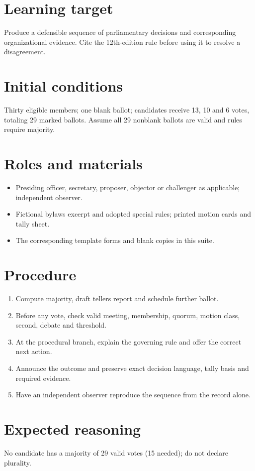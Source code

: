 \documentclass[11pt]{article}
\begin{document}
\SuiteOpen
\section{Learning target}
Produce a defensible sequence of parliamentary decisions and corresponding organizational evidence. Cite the 12th-edition rule before using it to resolve a disagreement.

\section{Initial conditions}
Thirty eligible members; one blank ballot; candidates receive 13, 10 and 6 votes, totaling 29 marked ballots. Assume all 29 nonblank ballots are valid and rules require majority.

\section{Roles and materials}
\begin{itemize}[leftmargin=*,itemsep=4pt]
\item Presiding officer, secretary, proposer, objector or challenger as applicable; independent observer.
\item Fictional bylaws excerpt and adopted special rules; printed motion cards and tally sheet.
\item The corresponding template forms and blank copies in this suite.
\end{itemize}

\section{Procedure}
\begin{enumerate}[leftmargin=*,itemsep=4pt]
\item Compute majority, draft tellers report and schedule further ballot.
\item Before any vote, check valid meeting, membership, quorum, motion class, second, debate and threshold.
\item At the procedural branch, explain the governing rule and offer the correct next action.
\item Announce the outcome and preserve exact decision language, tally basis and required evidence.
\item Have an independent observer reproduce the sequence from the record alone.
\end{enumerate}

\section{Expected reasoning}
No candidate has a majority of 29 valid votes (15 needed); do not declare plurality.
\end{document}
